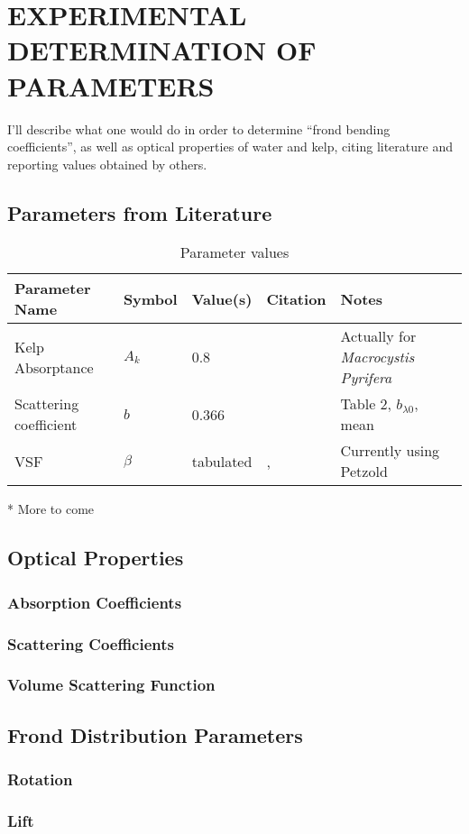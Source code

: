\chapter{EXPERIMENTAL DETERMINATION OF PARAMETERS} \label{ch:experiment}

I'll describe what one would do in order to determine
``frond bending coefficients'', as well as optical properties of water and kelp,
citing literature and reporting values obtained by others.

\section{Parameters from Literature}
\begin{table}
  \caption{Parameter values}
  \centering
  \begin{tabular}{p{} p{} p{} p{} p{}}
    \toprule
    Parameter Name & Symbol & Value(s) & Citation & Notes \\
    \midrule
    Kelp Absorptance & $A_k$ & 0.8 & \cite{colombo-pallotta_photosynthetic_2006} & Actually for \textit{Macrocystis Pyrifera}\\
    Scattering coefficient & $b$ & 0.366 & \cite{sokolov_parameterization_2010} & Table 2, $b_{\lambda 0}$, mean \\
    VSF & $\beta$ & tabulated & \cite{petzold_volume_1972,sokolov_parameterization_2010}, & Currently using Petzold\\ 
    \bottomrule
  \end{tabular}
\end{table}

* More to come

\section{Optical Properties}
\subsection{Absorption Coefficients}
\subsection{Scattering Coefficients}
\subsection{Volume Scattering Function}

\section{Frond Distribution Parameters}
\subsection{Rotation}
\subsection{Lift}
